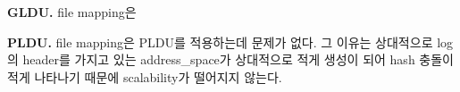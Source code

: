 \noindent
\textbf{GLDU.} 
file mapping은 



\noindent
\textbf{PLDU.} 
file mapping은 PLDU를 적용하는데 문제가 없다.
그 이유는 상대적으로 log의 header를 가지고 있는 address\_space가 상대적으로 적게 생성이 되어 hash 충돌이 적게 나타나기
때문에 scalability가 떨어지지 않는다.









 

